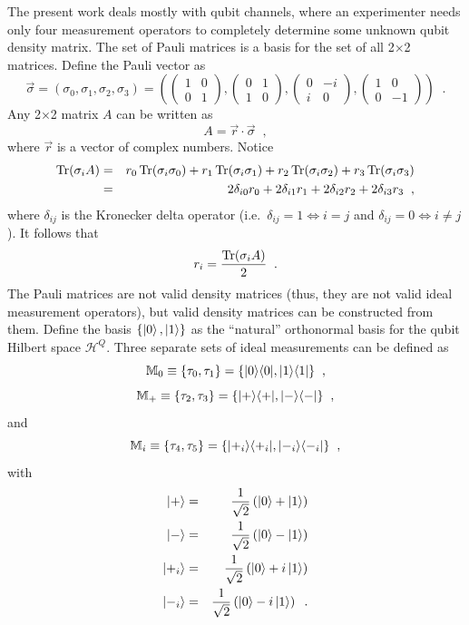The present work deals mostly with qubit channels, where an experimenter needs only four measurement operators to completely determine some unknown qubit density matrix.  The set of Pauli matrices is a basis for the set of all 2$\times$2 matrices.  Define the Pauli vector as 
$$
\vec{\sigma} = (\sigma_0,\sigma_1,\sigma_2,\sigma_3) = \left(
\begin{pmatrix}
1&0\\0&1
\end{pmatrix},
\begin{pmatrix}
0&1\\1&0
\end{pmatrix},
\begin{pmatrix}
0&-i\\i&0
\end{pmatrix},
\begin{pmatrix}
1&0\\0&-1
\end{pmatrix}
\right)\;\;.
$$
Any 2$\times$2 matrix $A$ can be written as
$$
A = \vec{r}\cdot\vec{\sigma}\;\;,
$$
where $\vec{r}$ is a vector of complex numbers.  Notice
\begin{eqnarray*}
\operatorname{Tr}(\sigma_i A) &=& r_0\operatorname{Tr}(\sigma_i \sigma_0)+r_1\operatorname{Tr}(\sigma_i \sigma_1)+r_2\operatorname{Tr}(\sigma_i \sigma_2)+r_3\operatorname{Tr}(\sigma_i \sigma_3)\\
&=& 2\delta_{i0}r_0 + 2\delta_{i1}r_1 + 2\delta_{i2}r_2 + 2\delta_{i3}r_3  \;\;,
\end{eqnarray*}
where $\delta_{ij}$ is the Kronecker delta operator (i.e.\ $\delta_{ij} = 1\Leftrightarrow i=j$ and $\delta_{ij} = 0\Leftrightarrow i\neq j$).  It follows that
$$
r_i = \frac{\operatorname{Tr}(\sigma_i A)}{2}\;\;.
$$
The Pauli matrices are not valid density matrices (thus, they are not valid ideal measurement operators), but valid density matrices can be constructed from them.  Define the basis $\{\left|0\right\rangle,\left|1\right\rangle\}$ as the ``natural'' orthonormal basis for the qubit Hilbert space $\mathcal{H}^Q$.  Three separate sets of ideal measurements can be defined as
$$
\mathbb{M}_{0} \equiv \{\tau_0,\tau_1\} = \{|0\rangle\langle0|,|1\rangle\langle1|\}\;\;,
$$
$$
\mathbb{M}_{+} \equiv \{\tau_2,\tau_3\} = \{|+\rangle\langle+|,|-\rangle\langle-|\}\;\;,
$$
and
$$
\mathbb{M}_{i} \equiv \{\tau_4,\tau_5\} = \{|+_i\rangle\langle+_i|,|-_i\rangle\langle-_i|\}\;\;,
$$
with
\begin{eqnarray*}
\left|+\right\rangle &=& \frac{1}{\sqrt{2}}\left(\left|0\right\rangle+\left|1\right\rangle\right)\\
\left|-\right\rangle &=& \frac{1}{\sqrt{2}}\left(\left|0\right\rangle-\left|1\right\rangle\right)\\
\left|+_i\right\rangle &=& \frac{1}{\sqrt{2}}\left(\left|0\right\rangle+i\left|1\right\rangle\right)\\
\left|-_i\right\rangle &=& \frac{1}{\sqrt{2}}\left(\left|0\right\rangle-i\left|1\right\rangle\right)\;\;.
\end{eqnarray*}

